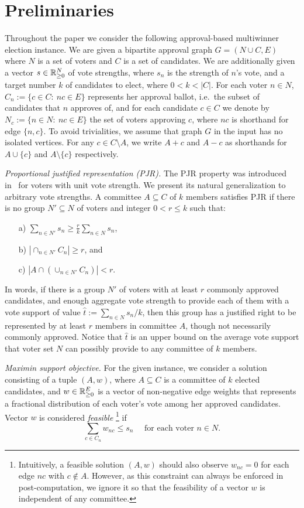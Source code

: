 \section{Preliminaries}\label{s:prel}

Throughout the paper we consider the following approval-based multiwinner election instance. 
We are given a bipartite approval graph $G=(N\cup C, E)$ where $N$ is a set of voters and $C$ is a set of candidates. 
We are additionally given a vector $s\in\mathbb{R}_{\geq 0}^N$ of vote strengths, where $s_n$ is the strength of $n$'s vote, and a target number $k$ of candidates to elect, where $0< k<|C|$.
For each voter $n\in N$, $C_n:=\{c\in C: \ nc\in E\}$ represents her approval ballot, i.e.~the subset of candidates that $n$ approves of, and for each candidate $c\in C$ we denote by $N_c:=\{n\in N: \ nc\in E\}$ the set of voters approving $c$, where $nc$ is shorthand for edge $\{n,c\}$. 
To avoid trivialities, we assume that graph $G$ in the input has no isolated vertices. 
For any $c\in C\setminus A$, we write $A+c$ and $A-c$ as shorthands for $A\cup\{c\}$ and $A\setminus \{c\}$ respectively. 

\emph{Proportional justified representation (PJR).} 
The PJR property was introduced in~\cite{sanchez2017proportional} for voters with unit vote strength. We present its natural generalization to arbitrary vote strengths. A committee $A\subseteq C$ of $k$ members satisfies PJR if there is no group $N'\subseteq N$ of voters and integer $0<r\leq k$ such that:
\begin{itemize}
\item[a)] $\sum_{n\in N'} s_n \geq \frac{r}{k} \sum_{n\in N}s_n$,
\item[b)] $|\cap_{n\in N'} C_n|\geq r$, and
\item[c)] $|A\cap (\cup_{n\in N'} C_n)|<r$.
\end{itemize}

In words, if there is a group $N'$ of voters with at least $r$ commonly approved candidates, and enough aggregate vote strength to provide each of them with a vote support of value $\hat{t}:=\sum_{n\in N} s_n / k$, then this group has a justified right to be represented by at least $r$ members in committee $A$, though not necessarily commonly approved. 
Notice that $\hat{t}$ is an upper bound on the average vote support that voter set $N$ can possibly provide to any committee of $k$ members. 

\emph{Maximin support objective.} 
For the given instance, we consider a solution consisting of a tuple $(A,w)$, where $A\subseteq C$ is a committee of $k$ elected candidates, and $w\in\mathbb{R}_{\geq 0}^E$ is a vector of non-negative edge weights that represents a fractional distribution of each voter's vote among her approved candidates. Vector $w$ is considered \emph{feasible}%
\footnote{Intuitively, a feasible solution $(A,w)$ should also observe $w_{nc}=0$ for each edge $nc$ with $c\not\in A$. 
However, as this constraint can always be enforced in post-computation, we ignore it so that the feasibility of a vector $w$ is independent of any committee.} 
if  %
%
\begin{equation}
    \sum_{c\in C_n} w_{nc}\leq s_n \quad \text{ for each voter } n\in N. \label{eq:feasible}
\end{equation}

